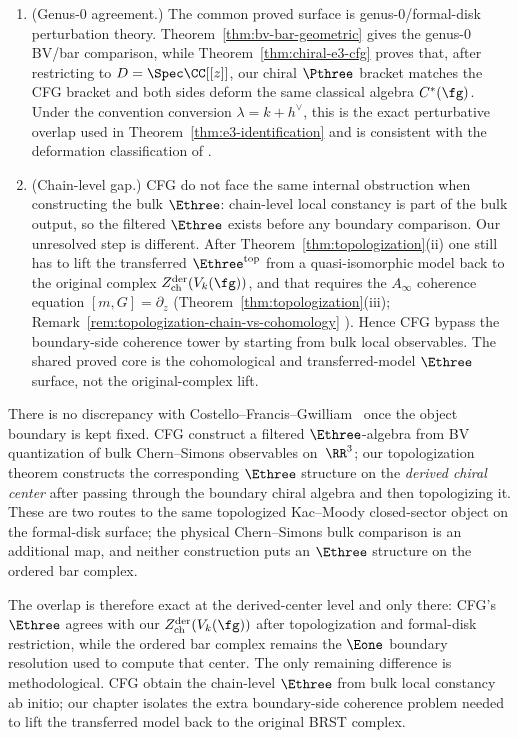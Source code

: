 \begin{remark}
\begin{enumerate}[label=\textup{(\roman*)}]
\item \textup{(Genus-$0$ agreement.)}
 The common proved surface is genus-$0$/formal-disk perturbation
 theory. Theorem~\textup{\ref{thm:bv-bar-geometric}} gives the
 genus-$0$ BV/bar comparison, while
 Theorem~\textup{\ref{thm:chiral-e3-cfg}} proves that, after
 restricting to $D = \Spec \CC[[z]]$, our chiral $\Pthree$ bracket
 matches the CFG bracket and both sides deform the same classical
 algebra $C^*(\fg)$. Under the convention conversion
 $\lambda = k + h^\vee$, this is the exact perturbative overlap used
 in Theorem~\textup{\ref{thm:e3-identification}} and is consistent
 with the deformation classification of
 \cite[Theorem~1.4]{CFG25}.

\item \textup{(Chain-level gap.)}
 CFG do not face the same internal obstruction when constructing the
 bulk $\Ethree$: chain-level local constancy is part of the bulk
 output, so the filtered $\Ethree$ exists before any boundary
 comparison. Our unresolved step is different. After
 Theorem~\textup{\ref{thm:topologization}(ii)} one still has to lift
 the transferred $\Ethree^{\mathrm{top}}$ from a quasi-isomorphic
 model back to the original complex
 $Z^{\mathrm{der}}_{\mathrm{ch}}(V_k(\fg))$, and that requires the
 $A_\infty$ coherence equation
 $[m,G] = \partial_z$
 \textup{(}Theorem~\textup{\ref{thm:topologization}(iii)};
 Remark~\textup{\ref{rem:topologization-chain-vs-cohomology}}%
 \textup{)}. Hence CFG bypass the boundary-side coherence tower by
 starting from bulk local observables. The shared proved core is the
cohomological and transferred-model $\Ethree$ surface, not the
original-complex lift.
\end{enumerate}
\end{remark}

\begin{remark}
There is no discrepancy with
Costello--Francis--Gwilliam~\cite{CFG25} once the object boundary is
kept fixed. CFG construct a filtered $\Ethree$-algebra from BV
quantization of bulk Chern--Simons observables on~$\RR^3$; our
topologization theorem constructs the corresponding $\Ethree$ structure
on the \emph{derived chiral center} after passing through the boundary
chiral algebra and then topologizing it. These are two routes to the
same topologized Kac--Moody closed-sector object on the formal-disk
surface; the physical Chern--Simons bulk comparison is an additional
map, and neither construction puts an $\Ethree$ structure on the
ordered bar complex.

The overlap is therefore exact at the derived-center level and only
there: CFG's $\Ethree$ agrees with our
$Z^{\mathrm{der}}_{\mathrm{ch}}(V_k(\fg))$ after topologization and
formal-disk restriction, while the ordered bar complex remains the
$\Eone$ boundary resolution used to compute that center. The only
remaining difference is methodological. CFG obtain the chain-level
$\Ethree$ from bulk local constancy ab initio; our chapter isolates the
extra boundary-side coherence problem needed to lift the transferred
model back to the original BRST complex.
\end{remark}

